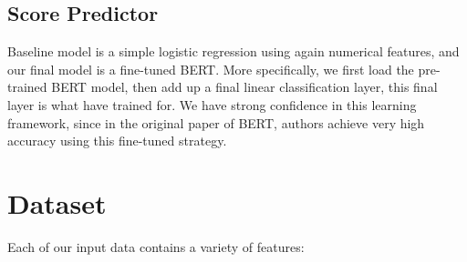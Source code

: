 \documentclass{article}
\begin{document}
\subsection{Score Predictor}
Baseline model is a simple logistic regression using again numerical features, and our final model is a fine-tuned BERT. More specifically, we first load the pre-trained BERT model, then add up a final linear classification layer, this final layer is what have trained for. We have strong confidence in this learning framework, since in the original paper of BERT, authors achieve very high accuracy using this fine-tuned strategy.

\section{Dataset}
Each of our input data contains a variety of features:
\end{document}
